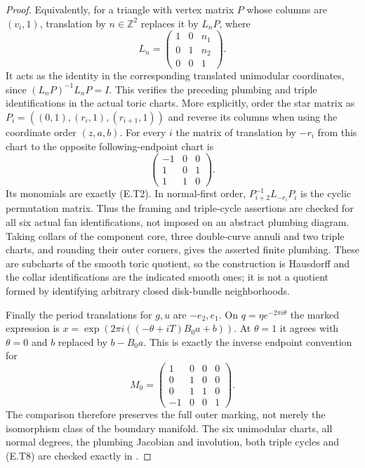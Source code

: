 \begin{proof}
Equivalently, for a triangle with vertex matrix $P$ whose
columns are $(v_i,1)$, translation by $n\in\mathbb Z^2$
replaces it by $L_nP$, where
\[
 L_n=\begin{pmatrix}1&0&n_1\\0&1&n_2\\0&0&1\end{pmatrix}.
 \tag{E.T7}
\]
It acts as the identity in the corresponding translated
unimodular coordinates, since
$(L_nP)^{-1}L_nP=I$.  This verifies the preceding plumbing
and triple identifications in the actual toric charts.
More explicitly, order the star matrix as
$P_i=((0,1),(r_i,1),(r_{i+1},1))$ and reverse its
columns when using the coordinate order $(z,a,b)$.
For every $i$ the matrix of translation by $-r_i$ from
this chart to the opposite following-endpoint chart is
\[
 \begin{pmatrix}-1&0&0\\1&0&1\\1&1&0\end{pmatrix}.
 \tag{E.T9}
\]
Its monomials are exactly (E.T2).  In normal-first order,
$P_{i+2}^{-1}L_{-r_i}P_i$ is the cyclic permutation
matrix.  Thus the framing and triple-cycle assertions
are checked for all six actual fan identifications,
not imposed on an abstract plumbing diagram.
Taking collars of the component core, three double-curve
annuli and two triple charts, and rounding their outer
corners, gives the asserted finite plumbing.  These are
subcharts of the smooth toric quotient, so the construction
is Hausdorff and the collar identifications are the indicated
smooth ones; it is not a quotient formed by identifying
arbitrary closed disk-bundle neighborhoods.

Finally the period translations for $g,u$ are $-e_2,e_1$.
On $q=\eta e^{-2\pi i\theta}$ the marked expression is
$x=\exp(2\pi i((-\theta+iT)B_0a+b))$.
At $\theta=1$ it agrees with $\theta=0$ and
$b$ replaced by $b-B_0a$.  This is exactly the inverse
endpoint convention for
\[
 M_0=\begin{pmatrix}
 1&0&0&0\\0&1&0&0\\0&1&1&0\\-1&0&0&1
 \end{pmatrix}.
 \tag{E.T8}
\]
The comparison therefore preserves the full outer marking,
not merely the isomorphism class of the boundary manifold.
The six unimodular charts, all normal degrees, the plumbing
Jacobian and involution, both triple cycles and (E.T8) are
checked exactly in .
\end{proof}
